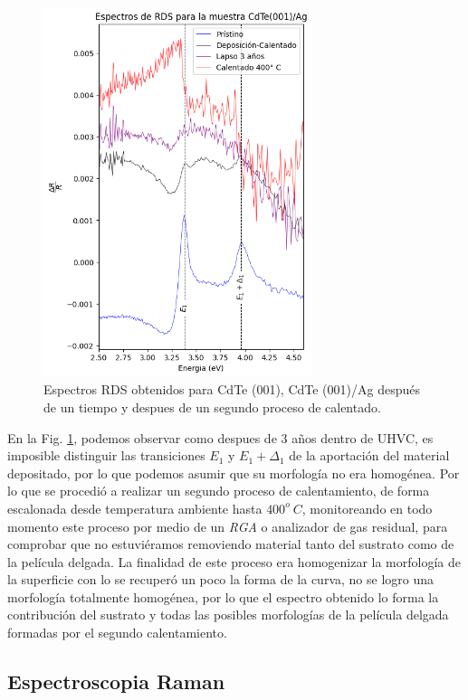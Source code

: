 \begin{figure}[H]
    \centering
    \includegraphics[width=0.7\textwidth]{figures/chap4/cdte-ag/rds-results/output-rds.png}
        \caption{Espectros RDS obtenidos para CdTe (001), CdTe (001)/Ag después de un tiempo y despues de un segundo proceso de calentado.}
    \label{fig:cdte-rds-3}
\end{figure}

En la Fig. \ref{fig:cdte-rds-3}, podemos observar como despues de 3 años dentro de UHVC, es imposible distinguir las transiciones $E_{1}$ y $E_{1}+\Delta_{1}$ de la aportación del material depositado, por lo que podemos asumir que su morfología no era homogénea. Por lo que se procedió a realizar un segundo proceso de calentamiento, de forma escalonada desde temperatura ambiente hasta $400^{o}\ C$, monitoreando en todo momento este proceso por medio de un \textit{RGA} o analizador de gas residual, para comprobar que no estuviéramos removiendo material tanto del sustrato como de la película delgada. La finalidad de este proceso era homogenizar la morfología de la superficie con lo se recuperó un poco la forma de la curva, no se logro una morfología totalmente homogénea, por lo que el espectro obtenido lo forma la contribución del sustrato y todas las posibles morfologías de la película delgada formadas por el segundo calentamiento.

\subsection{Espectroscopia Raman}
\label{sec:chap4-cdte-raman}

